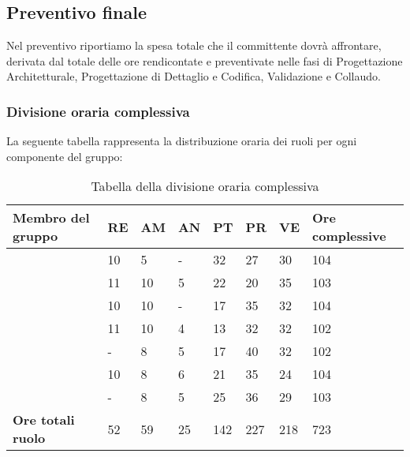 \subsection{Preventivo finale} 
Nel preventivo riportiamo la spesa totale che il committente dovrà affrontare, derivata dal totale delle ore rendicontate e preventivate nelle fasi di Progettazione Architetturale, Progettazione di Dettaglio e Codifica, Validazione e Collaudo.

\subsubsection{Divisione oraria complessiva} 
La seguente tabella rappresenta la distribuzione oraria dei ruoli per ogni componente del gruppo:
{
\renewcommand{\arraystretch}{2}
\begin{longtable}[h!] { C{4cm} C{1cm} C{1cm} C{1cm} C{1cm} C{1cm} C{1cm} C{3cm}}
\caption{Tabella della divisione oraria complessiva}	\\
\rowcolor{\primaryColor}

\textcolor{\secondaryColor}{\textbf{Membro del gruppo}} & 
\textcolor{\secondaryColor}{\textbf{RE}} & 
\textcolor{\secondaryColor}{\textbf{AM}} & 
\textcolor{\secondaryColor}{\textbf{AN}} & 
\textcolor{\secondaryColor}{\textbf{PT}} & 
\textcolor{\secondaryColor}{\textbf{PR}} & 
\textcolor{\secondaryColor}{\textbf{VE}} & 
\textcolor{\secondaryColor}{\textbf{Ore complessive}}\\	
\endhead

\AW{}                     &  10 & 5 & - & 32 & 27 & 30 & 104 \\
\AT{}                     &  11 &  10 & 5 & 22 & 20 & 35 & 103 \\
\AD{}                     &  10 &  10 & - & 17 & 35 & 32 & 104 \\
\EC{}                     &  11 &  10 &  4 & 13 & 32 & 32 & 102 \\
\EM{}                     &  -  & 8  &  5 & 17 & 40 & 32 & 102 \\
\FP{}                     &  10 & 8  &  6 & 21 & 35 & 24 & 104 \\
\GG{}                     &  -  & 8  & 5 & 25 & 36 & 29 & 103 \\
\textbf{Ore totali ruolo} & 52  & 59 & 25 & 142 & 227 & 218 & 723 \\
\end{longtable}
}

